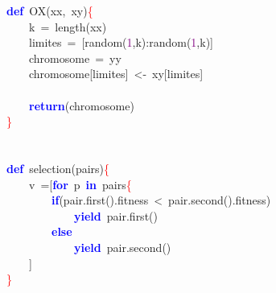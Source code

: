 \noindent
\mbox{}\textbf{\textcolor{Blue}{def}}\ OX\textcolor{BrickRed}{(}xx\textcolor{BrickRed}{,}\ xy\textcolor{BrickRed}{)}\textcolor{Red}{\{} \\
\mbox{}\ \ \ \ k\ \textcolor{BrickRed}{=}\ length\textcolor{BrickRed}{(}xx\textcolor{BrickRed}{)} \\
\mbox{}\ \ \ \ limites\ \textcolor{BrickRed}{=}\ \textcolor{BrickRed}{[}random\textcolor{BrickRed}{(}\textcolor{Purple}{1}\textcolor{BrickRed}{,}k\textcolor{BrickRed}{):}random\textcolor{BrickRed}{(}\textcolor{Purple}{1}\textcolor{BrickRed}{,}k\textcolor{BrickRed}{)]} \\
\mbox{}\ \ \ \ chromosome\ \textcolor{BrickRed}{=}\ yy \\
\mbox{}\ \ \ \ chromosome\textcolor{BrickRed}{[}limites\textcolor{BrickRed}{]}\ \textcolor{BrickRed}{\textless{}-}\ xy\textcolor{BrickRed}{[}limites\textcolor{BrickRed}{]} \\
\mbox{} \\
\mbox{}\ \ \ \ \textbf{\textcolor{Blue}{return}}\textcolor{BrickRed}{(}chromosome\textcolor{BrickRed}{)} \\
\mbox{}\textcolor{Red}{\}} \\
\mbox{} \\
\mbox{} \\
\mbox{}\textbf{\textcolor{Blue}{def}}\ selection\textcolor{BrickRed}{(}pairs\textcolor{BrickRed}{)}\textcolor{Red}{\{} \\
\mbox{}\ \ \ \ v\ \textcolor{BrickRed}{=[}\textbf{\textcolor{Blue}{for}}\ p\ \textbf{\textcolor{Blue}{in}}\ pairs\textcolor{Red}{\{} \\
\mbox{}\ \ \ \ \ \ \ \ \textbf{\textcolor{Blue}{if}}\textcolor{BrickRed}{(}pair\textcolor{BrickRed}{.}first\textcolor{BrickRed}{().}fitness\ \textcolor{BrickRed}{\textless{}}\ pair\textcolor{BrickRed}{.}second\textcolor{BrickRed}{().}fitness\textcolor{BrickRed}{)} \\
\mbox{}\ \ \ \ \ \ \ \ \ \ \ \ \textbf{\textcolor{Blue}{yield}}\ pair\textcolor{BrickRed}{.}first\textcolor{BrickRed}{()} \\
\mbox{}\ \ \ \ \ \ \ \ \textbf{\textcolor{Blue}{else}} \\
\mbox{}\ \ \ \ \ \ \ \ \ \ \ \ \textbf{\textcolor{Blue}{yield}}\ pair\textcolor{BrickRed}{.}second\textcolor{BrickRed}{()} \\
\mbox{}\ \ \ \ \textcolor{BrickRed}{]} \\
\mbox{}\textcolor{Red}{\}} \\
